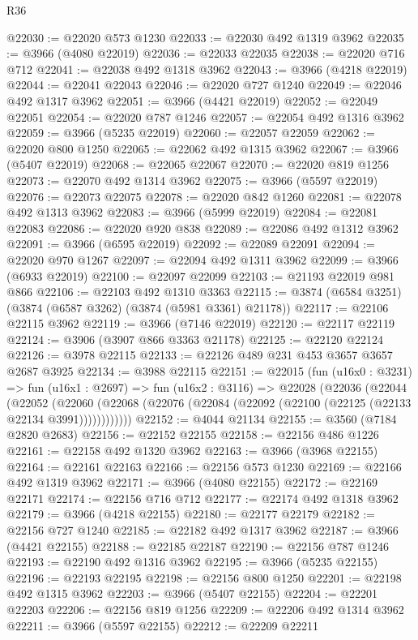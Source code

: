 \begin{lexlean}{R36}
\begin{coremodule}
@22030 := @22020 @573 @1230
@22033 := @22030 @492 @1319 @3962
@22035 := @3966 (@4080 @22019)
@22036 := @22033 @22035
@22038 := @22020 @716 @712
@22041 := @22038 @492 @1318 @3962
@22043 := @3966 (@4218 @22019)
@22044 := @22041 @22043
@22046 := @22020 @727 @1240
@22049 := @22046 @492 @1317 @3962
@22051 := @3966 (@4421 @22019)
@22052 := @22049 @22051
@22054 := @22020 @787 @1246
@22057 := @22054 @492 @1316 @3962
@22059 := @3966 (@5235 @22019)
@22060 := @22057 @22059
@22062 := @22020 @800 @1250
@22065 := @22062 @492 @1315 @3962
@22067 := @3966 (@5407 @22019)
@22068 := @22065 @22067
@22070 := @22020 @819 @1256
@22073 := @22070 @492 @1314 @3962
@22075 := @3966 (@5597 @22019)
@22076 := @22073 @22075
@22078 := @22020 @842 @1260
@22081 := @22078 @492 @1313 @3962
@22083 := @3966 (@5999 @22019)
@22084 := @22081 @22083
@22086 := @22020 @920 @838
@22089 := @22086 @492 @1312 @3962
@22091 := @3966 (@6595 @22019)
@22092 := @22089 @22091
@22094 := @22020 @970 @1267
@22097 := @22094 @492 @1311 @3962
@22099 := @3966 (@6933 @22019)
@22100 := @22097 @22099
@22103 := @21193 @22019 @981 @866
@22106 := @22103 @492 @1310 @3363
@22115 := @3874 (@6584 @3251) (@3874 (@6587 @3262) (@3874 (@5981 @3361) @21178))
@22117 := @22106 @22115 @3962
@22119 := @3966 (@7146 @22019)
@22120 := @22117 @22119
@22124 := @3906 (@3907 @866 @3363 @21178)
@22125 := @22120 @22124
@22126 := @3978 @22115
@22133 := @22126 @489 @231 @453 @3657 @3657 @2687 @3925
@22134 := @3988 @22115
@22151 := @22015
    (fun (u16x0 : @3231) =>
    fun (u16x1 : @2697) =>
    fun (u16x2 : @3116) =>
    @22028
      (@22036
        (@22044
          (@22052
            (@22060 (@22068 (@22076 (@22084 (@22092 (@22100 (@22125 (@22133 @22134 @3991))))))))))))
@22152 := @4044 @21134
@22155 := @3560 (@7184 @2820 @2683)
@22156 := @22152 @22155
@22158 := @22156 @486 @1226
@22161 := @22158 @492 @1320 @3962
@22163 := @3966 (@3968 @22155)
@22164 := @22161 @22163
@22166 := @22156 @573 @1230
@22169 := @22166 @492 @1319 @3962
@22171 := @3966 (@4080 @22155)
@22172 := @22169 @22171
@22174 := @22156 @716 @712
@22177 := @22174 @492 @1318 @3962
@22179 := @3966 (@4218 @22155)
@22180 := @22177 @22179
@22182 := @22156 @727 @1240
@22185 := @22182 @492 @1317 @3962
@22187 := @3966 (@4421 @22155)
@22188 := @22185 @22187
@22190 := @22156 @787 @1246
@22193 := @22190 @492 @1316 @3962
@22195 := @3966 (@5235 @22155)
@22196 := @22193 @22195
@22198 := @22156 @800 @1250
@22201 := @22198 @492 @1315 @3962
@22203 := @3966 (@5407 @22155)
@22204 := @22201 @22203
@22206 := @22156 @819 @1256
@22209 := @22206 @492 @1314 @3962
@22211 := @3966 (@5597 @22155)
@22212 := @22209 @22211

\end{coremodule}
\end{lexlean}
